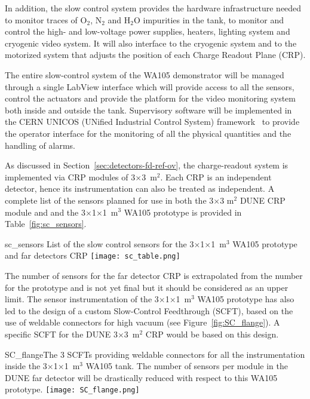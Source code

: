 In addition, the slow control system provides the hardware
infrastructure needed to monitor traces of O$_2$, N$_2$ and H$_2$O
impurities in the tank, to monitor and control the high- and
low-voltage power supplies, heaters, lighting system and cryogenic
video system. It will also interface to the cryogenic system and to
the motorized system that adjusts the position of each Charge Readout
Plane (CRP).

The entire slow-control system of the WA105 demonstrator will be
managed through a single LabView interface\cite{WA105_SREP} which
will provide access to all the sensors, control the actuators and
provide the platform for the video monitoring system both inside and
outside the tank.  Supervisory software will be implemented in the
CERN UNICOS (UNified Industrial Control System)
framework~\cite{unicos} to provide the operator interface for the
monitoring of all the physical quantities and the handling of alarms.

As discussed in Section~\ref{sec:detectors-fd-ref-ov}, the
charge-readout system is implemented via CRP modules of
3$\times$3~m$^2$. Each CRP is an independent detector, hence its
instrumentation can also be treated as independent. A complete list of
the sensors planned for use in both the 3$\times$3 m$^2$ DUNE CRP
module and and the 3$\times$1$\times$1~m$^3$ WA105 prototype is
provided in Table~\ref{fig:sc_sensors}.
\begin{cdrfigure}{sc_sensors}
{List of the slow control sensors for the 3$\times$1$\times$1~m$^3$ WA105 prototype and far detectors CRP}
 \texttt{[image: sc\_table.png]} 
 \end{cdrfigure}

The number of sensors for the far detector CRP is extrapolated from
the number for the prototype and is not yet final but it should be
considered as an upper limit. The sensor instrumentation of the
3$\times$1$\times$1~m$^3$ WA105 prototype has also led to the design
of a custom Slow-Control Feedthrough (SCFT), based on the use of
weldable connectors for high vacuum (see
Figure~\ref{fig:SC_flange}). A specific SCFT for the DUNE
3$\times$3~m$^2$ CRP would be based on this design.
\begin{cdrfigure}{SC_flange}{The 3 SCFTs providing 
weldable connectors for all the instrumentation inside the 3$\times$1$\times$1~m$^3$  WA105 tank. 
The number of sensors per module in the DUNE far detector will be drastically 
reduced with respect to this WA105 prototype.}
  \texttt{[image: SC\_flange.png]}
 \end{cdrfigure}
